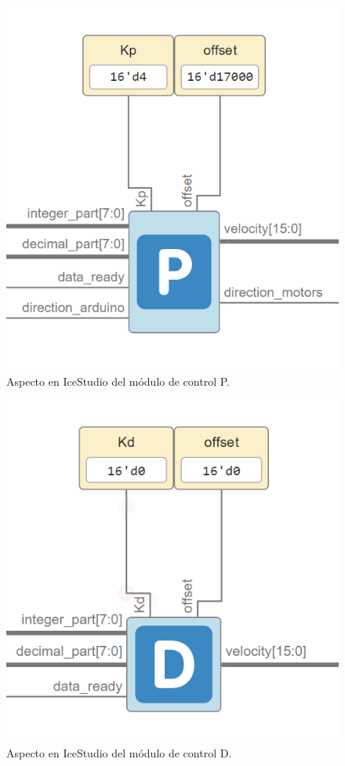 \begin{figure}[H]
	\center
	\includegraphics[scale=0.5]{imagenes/Balancing_robot/Pcontrol}
	\caption{Aspecto en IceStudio del módulo de control P.}
	\label{fig:Pcontrol}
\end{figure}

\begin{figure}[H]
	\center
	\includegraphics[scale=0.5]{imagenes/Balancing_robot/Dcontrol}
	\caption{Aspecto en IceStudio del módulo de control D.}
	\label{fig:Dcontrol}
\end{figure}

